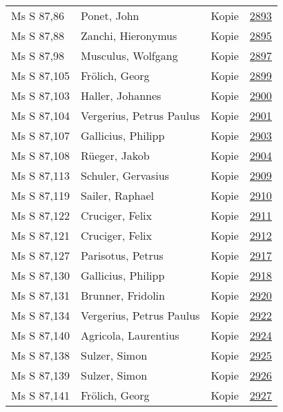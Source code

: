 \documentclass[10pt,a4paper,landscape]{report}
\begin{document}
\begin{longtable}{p{16cm}p{4cm}lr}
Ms S 87,86	&	Ponet, John	&	Kopie	&	\href{http://130.60.24.72/assignment/2893}{2893}\\
Ms S 87,88	&	Zanchi, Hieronymus	&	Kopie	&	\href{http://130.60.24.72/assignment/2895}{2895}\\
Ms S 87,98	&	Musculus, Wolfgang	&	Kopie	&	\href{http://130.60.24.72/assignment/2897}{2897}\\
Ms S 87,105	&	Frölich, Georg	&	Kopie	&	\href{http://130.60.24.72/assignment/2899}{2899}\\
Ms S 87,103	&	Haller, Johannes	&	Kopie	&	\href{http://130.60.24.72/assignment/2900}{2900}\\
Ms S 87,104	&	Vergerius, Petrus Paulus	&	Kopie	&	\href{http://130.60.24.72/assignment/2901}{2901}\\
Ms S 87,107	&	Gallicius, Philipp	&	Kopie	&	\href{http://130.60.24.72/assignment/2903}{2903}\\
Ms S 87,108	&	Rüeger, Jakob	&	Kopie	&	\href{http://130.60.24.72/assignment/2904}{2904}\\
Ms S 87,113	&	Schuler, Gervasius	&	Kopie	&	\href{http://130.60.24.72/assignment/2909}{2909}\\
Ms S 87,119	&	Sailer, Raphael	&	Kopie	&	\href{http://130.60.24.72/assignment/2910}{2910}\\
Ms S 87,122	&	Cruciger, Felix	&	Kopie	&	\href{http://130.60.24.72/assignment/2911}{2911}\\
Ms S 87,121	&	Cruciger, Felix	&	Kopie	&	\href{http://130.60.24.72/assignment/2912}{2912}\\
Ms S 87,127	&	Parisotus, Petrus	&	Kopie	&	\href{http://130.60.24.72/assignment/2917}{2917}\\
Ms S 87,130	&	Gallicius, Philipp	&	Kopie	&	\href{http://130.60.24.72/assignment/2918}{2918}\\
Ms S 87,131	&	Brunner, Fridolin	&	Kopie	&	\href{http://130.60.24.72/assignment/2920}{2920}\\
Ms S 87,134	&	Vergerius, Petrus Paulus	&	Kopie	&	\href{http://130.60.24.72/assignment/2922}{2922}\\
Ms S 87,140	&	Agricola, Laurentius	&	Kopie	&	\href{http://130.60.24.72/assignment/2924}{2924}\\
Ms S 87,138	&	Sulzer, Simon	&	Kopie	&	\href{http://130.60.24.72/assignment/2925}{2925}\\
Ms S 87,139	&	Sulzer, Simon	&	Kopie	&	\href{http://130.60.24.72/assignment/2926}{2926}\\
Ms S 87,141	&	Frölich, Georg	&	Kopie	&	\href{http://130.60.24.72/assignment/2927}{2927}\\

\end{longtable}
\end{document}

